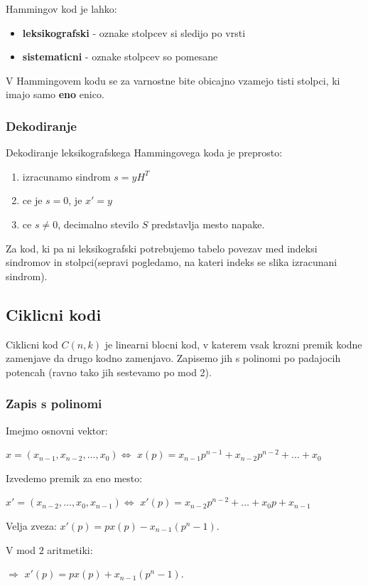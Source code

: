 \documentclass{article}
\begin{document}
\begin{multicols}{4}
Hammingov kod je lahko:
\begin{itemize}
    \item \textbf{leksikografski} - oznake stolpcev si sledijo po vrsti
    \item \textbf{sistematicni} - oznake stolpcev so pomesane
\end{itemize}

 V Hammingovem kodu se za varnostne bite obicajno vzamejo tisti stolpci, ki imajo samo \textbf{eno} enico.

\subsubsection{Dekodiranje}
Dekodiranje leksikografskega Hammingovega koda je preprosto:
\begin{enumerate}
    \item izracunamo sindrom $s = yH^T$
    \item ce je $s = 0$, je $x' = y$
    \item ce $s \neq 0$, decimalno stevilo $S$ predstavlja mesto napake.
\end{enumerate}
Za kod, ki pa ni leksikografski potrebujemo tabelo povezav med indeksi sindromov in stolpci(sepravi pogledamo, na kateri indeks se slika izracunani sindrom).

\subsection{Ciklicni kodi}
Ciklicni kod $C(n, k)$ je linearni blocni kod, v katerem vsak krozni premik kodne zamenjave
da drugo kodno zamenjavo. Zapisemo jih s polinomi po padajocih potencah (ravno tako jih sestevamo po mod 2). 

\subsubsection{Zapis s polinomi}
Imejmo osnovni vektor: 
\begin{center}
    $x = (x_{n-1}, x_{n-2}, \dots, x_0) \Leftrightarrow$
    $x(p) = x_{n-1}p^{n-1} + x_{n-2}p^{n-2} + \dots + x_0$ 
\end{center}
Izvedemo premik za eno mesto:
\begin{center}
    $x' = (x_{n-2}, \dots, x_0, x_{n-1}) \Leftrightarrow$
    $x'(p) = x_{n-2}p^{n-2} + \dots + x_0p + x_{n-1}$ 
\end{center}
Velja zveza: $x'(p) = px(p) - x_{n-1}(p^n -1)$.

V mod $2$ aritmetiki:
\begin{center}
    $\Rightarrow$ $x'(p) = px(p) + x_{n-1}(p^n -1)$.
\end{center}


\end{multicols}
\end{document}
